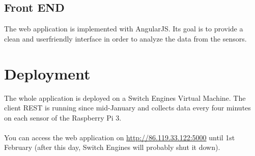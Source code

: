 \documentclass[a4paper]{article}
\begin{document}
\subsection{Front END}
The web application is implemented with AngularJS. Its goal is to provide a clean and userfriendly interface in order to analyze the data from the sensors.

\section{Deployment}
The whole application is deployed on a Switch Engines Virtual Machine. The client REST is running since mid-January and collects data every four minutes on each sensor of the Raspberry Pi 3.\\\\
You can access the web application on \url{http://86.119.33.122:5000} until 1st February (after this day, Switch Engines will probably shut it down).
\end{document}
